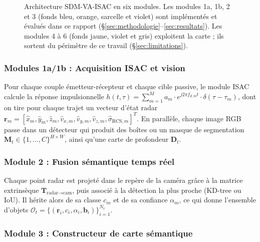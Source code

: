 \documentclass[12pt,a4paper,titlepage]{article}
\begin{document}
\begin{figure}[H]
{%
}
\caption{Architecture SDM-VA-ISAC en six modules. Les modules 1a, 1b, 2 et 3 (fonds bleu, orange, sarcelle et violet) sont implémentés et évalués dans ce rapport (\S\ref{sec:methodologie}--\ref{sec:resultats}). Les modules 4 à 6 (fonds jaune, violet et gris) exploitent la carte ; ils sortent du périmètre de ce travail (\S\ref{sec:limitations}).}
\label{fig:prop_arch}
\end{figure}

\subsubsection{Modules 1a/1b : Acquisition ISAC et vision}

Pour chaque couple émetteur-récepteur et chaque cible passive, le module ISAC calcule la réponse impulsionnelle $h(t,\tau) = \sum_{m=1}^{M} a_m \cdot e^{j2\pi f_{d,m} t} \cdot \delta(\tau-\tau_m)$, dont on tire pour chaque trajet un vecteur d'état radar $\mathbf{r}_m = [\hat{x}_m,\hat{y}_m,\hat{z}_m,\hat{v}_{x,m},\hat{v}_{y,m},\hat{v}_{z,m},\hat{\sigma}_{\text{RCS},m}]^T$. En parallèle, chaque image RGB passe dans un détecteur qui produit des boîtes ou un masque de segmentation $\mathbf{M}_t \in \{1,\ldots,C\}^{H\times W}$, ainsi qu'une carte de profondeur $\mathbf{D}_t$.

\subsubsection{Module 2 : Fusion sémantique temps réel}

Chaque point radar est projeté dans le repère de la caméra grâce à la matrice extrinsèque $\mathbf{T}_{\text{radar}\to\text{cam}}$, puis associé à la détection la plus proche (KD-tree ou IoU). Il hérite alors de sa classe $c_m$ et de sa confiance $\alpha_m$, ce qui donne l'ensemble d'objets $\mathcal{O}_t = \{(\mathbf{r}_i,c_i,\alpha_i,\mathbf{b}_i)\}_{i=1}^{N_t}$.

\subsubsection{Module 3 : Constructeur de carte sémantique}
\end{document}
